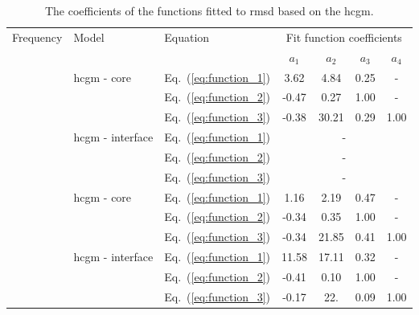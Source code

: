 \begin{table}
	\small
	\tabcolsep=0.2cm
	\centering
	\caption{\label{tab:fit_hcgm_RMSD}The coefficients of the functions fitted to \acf{rmsd} based on the \acf{hcgm}.}
	\begin{tabular}{cllcccc}
		\toprule
		\multirow{2}{*}{Frequency} & \multirow{2}{*}{Model} & Equation & \multicolumn{4}{c}{Fit function coefficients}\\
		& & & \(a_1\) & \(a_2\) & \(a_3\) & \(a_4\)\\
		\midrule
		\multirow{6}{*}{\rotatebox[origin=c]{90}{50 \unit{\kHz}}} & \multirow{3}{*}{\ac{hcgm} - core} & Eq.~(\ref{eq:function_1}) & 3.62 & 4.84 & 0.25 &-\\
		& & Eq.~(\ref{eq:function_2}) & -0.47 & 0.27 & 1.00 & -\\
		& & Eq.~(\ref{eq:function_3}) & -0.38 & 30.21 & 0.29 & 1.00 \\
		\cline{2-7}
		& \multirow{3}{*}{\ac{hcgm} - interface} & Eq.~(\ref{eq:function_1}) & \multicolumn{4}{c}{-}\\
		& & Eq.~(\ref{eq:function_2}) & \multicolumn{4}{c}{-} \\
		& & Eq.~(\ref{eq:function_3}) & \multicolumn{4}{c}{-} \\
		\midrule
		\multirow{6}{*}{\rotatebox[origin=c]{90}{100 \unit{\kHz}}} & \multirow{3}{*}{\ac{hcgm} - core} & Eq.~(\ref{eq:function_1}) & 1.16 & 2.19 & 0.47 &-\\
		& & Eq.~(\ref{eq:function_2}) & -0.34 & 0.35 & 1.00 &- \\
		& & Eq.~(\ref{eq:function_3}) & -0.34 & 21.85 & 0.41 & 1.00 \\
		\cline{2-7}
		& \multirow{3}{*}{\ac{hcgm} - interface} & Eq.~(\ref{eq:function_1}) & 11.58 & 17.11 & 0.32 & - \\
		& & Eq.~(\ref{eq:function_2}) & -0.41 & 0.10 & 1.00 & -\\
		& & Eq.~(\ref{eq:function_3}) & -0.17 & 22. & 0.09 & 1.00 \\
		\bottomrule
	\end{tabular}
\end{table}



